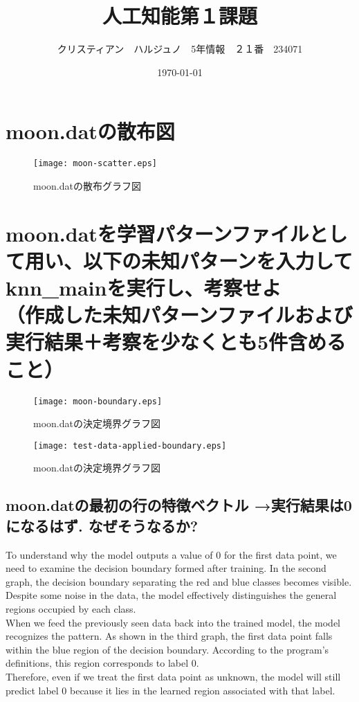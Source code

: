 \documentclass[a4j, twocolumn]{jarticle}
\begin{document}
\title{人工知能第１課題}
\author{クリスティアン　ハルジュノ　5年情報　２１番　234071}
\date{\today}
\maketitle
\section{moon.datの散布図}
\begin{figure}
  \begin{center}
    \texttt{[image: moon-scatter.eps]}
    \caption{moon.datの散布グラフ図}\label{scatterplot}
  \end{center}
\end{figure}
\section{moon.datを学習パターンファイルとして用い、以下の未知パターンを入力してknn\_mainを実行し、考察せよ\\
（作成した未知パターンファイルおよび実行結果＋考察を少なくとも5件含めること）}
\begin{figure}
  \begin{center}
    \texttt{[image: moon-boundary.eps]}
    \caption{moon.datの決定境界グラフ図}\label{boundarylinegraph}
  \end{center}
\end{figure}
\begin{figure}
  \begin{center}
    \texttt{[image: test-data-applied-boundary.eps]}
    \caption{moon.datの決定境界グラフ図}\label{boundarylinegraphtestdata}
  \end{center}
\end{figure}
\subsection{moon.datの最初の行の特徴ベクトル →実行結果は0になるはず. なぜそうなるか?}
To understand why the model outputs a value of 0 for the first data point, we need to examine the decision boundary formed after training.
In the second graph, the decision boundary separating the red and blue classes becomes visible. Despite some noise in the data, the model effectively distinguishes the general regions occupied by each class.\\
When we feed the previously seen data back into the trained model, the model recognizes the pattern. As shown in the third graph, the first data point falls within the blue region of the decision boundary. According to the program's definitions, this region corresponds to label 0.\\
Therefore, even if we treat the first data point as unknown, the model will still predict label 0 because it lies in the learned region associated with that label.\\
\end{document}
